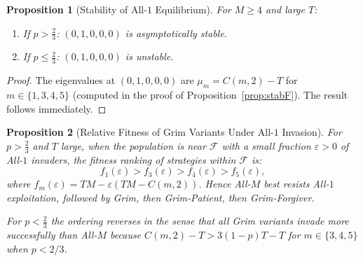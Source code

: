 \documentclass[12pt,a4paper]{article}
\newtheorem{proposition}{Proposition}[section]
\begin{document}
\begin{proposition}[Stability of All-$1$ Equilibrium]\label{prop:stabA1}
For $M\geq 4$ and large $T$:
\begin{enumerate}
  \item If $p>\tfrac{2}{3}$: $(0,1,0,0,0)$ is asymptotically stable.
  \item If $p\leq\tfrac{2}{3}$: $(0,1,0,0,0)$ is unstable.
\end{enumerate}
\end{proposition}

\begin{proof}
The eigenvalues at $(0,1,0,0,0)$ are $\mu_m = C(m,2)-T$ for $m\in\{1,3,4,5\}$
(computed in the proof of Proposition~\ref{prop:stabF}).  The result follows
immediately.
\end{proof}

\begin{proposition}[Relative Fitness of Grim Variants Under All-$1$ Invasion]
\label{prop:grimranking}
For $p>\tfrac{2}{3}$ and $T$ large, when the population is near $\mathcal{F}$
with a small fraction $\varepsilon>0$ of All-$1$ invaders, the fitness ranking
of strategies within $\mathcal{F}$ is:
\[
  f_1(\varepsilon) > f_3(\varepsilon) > f_4(\varepsilon) > f_5(\varepsilon),
\]
where $f_m(\varepsilon) = TM - \varepsilon(TM - C(m,2))$.  Hence All-$M$ best
resists All-$1$ exploitation, followed by Grim, then Grim-Patient, then
Grim-Forgiver.

For $p<\tfrac{2}{3}$ the ordering reverses in the sense that all Grim variants
invade more successfully than All-$M$ because $C(m,2)-T > 3(1-p)T-T$ for
$m\in\{3,4,5\}$ when $p<2/3$.
\end{proposition}
\end{document}
